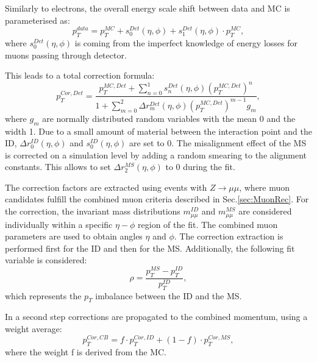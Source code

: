 Similarly to electrons, the overall energy scale shift between data and MC is parameterised as:
\begin{equation}
p_T^{data}=p_T^{MC}+s_0^{Det}(\eta, \phi)+s_1^{Det}(\eta, \phi) \cdot p_T^{MC},
\end{equation}
where $s_0^{Det}(\eta, \phi)$ is coming from the imperfect knowledge of energy losses for muons passing through detector. 

This leads to a total correction formula:
\begin{equation}
p^{Cor,Det}_T=\frac{p_{T}^{MC,Det}+\sum\limits_{n=0}^1 s_n^{Det}(\eta, \phi)(p_T^{MC,Det})^n}{1+\sum\limits_{m=0}^2 \Delta r_m^{Det}(\eta, \phi)(p_T^{MC,Det})^{m-1} g_m},
\end{equation}
where $g_m$ are normally distributed random variables with the mean 0 and the width 1. Due to a small amount of material between the interaction point and the ID, $\Delta r^{ID}_0(\eta, \phi)$ and $s_0^{ID}(\eta, \phi)$ are set to 0. The misalignment effect of the MS is corrected on a simulation level by adding a random smearing to the alignment constants. This allows to set $\Delta r^{MS}_2(\eta, \phi)$ to 0 during the fit. 

The correction factors are extracted using events with $Z \to \mu \mu$, where muon candidates fulfill the combined muon criteria described in Sec.\ref{sec:MuonRec}. For the correction, the invariant mass distributions $m_{\mu\mu}^{ID}$ and $m_{\mu\mu}^{MS}$ are considered individually within a specific $\eta - \phi$ region of the fit. The combined muon parameters are used to obtain angles $\eta$ and $\phi$. 
The correction extraction is performed first for the ID and then for the MS. Additionally, the following fit variable is considered:
\begin{equation}
\rho = \frac{p_T^{MS}-p_T^{ID}}{p_T^{ID}},
\end{equation}
which represents the $p_T$ imbalance between the ID and the MS. 

In a second step corrections are propagated to the combined momentum, using a weight average:
\begin{equation}
p_T^{Cor,CB}= f\cdot p_T^{Cor,ID}+(1-f) \cdot p_T^{Cor,MS},
\end{equation}
where the weight f is derived from the MC. 
